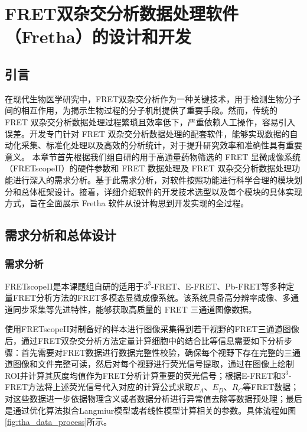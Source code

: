 \chapter{FRET双杂交分析数据处理软件（Fretha）的设计和开发}

\section{引言}

\ifshowtext
在现代生物医学研究中，FRET双杂交分析作为一种关键技术，用于检测生物分子间的相互作用，为揭示生物过程的分子机制提供了重要手段。然而，传统的 FRET 双杂交分析数据处理过程繁琐且效率低下，严重依赖人工操作，容易引入误差。开发专门针对 FRET 双杂交分析数据处理的配套软件，能够实现数据的自动化采集、标准化处理以及高效的分析统计，对于提升研究效率和准确性具有重要意义。
本章节首先根据我们组自研的用于高通量药物筛选的 FRET 显微成像系统（FRETscopeII）的硬件参数和 FRET 数据处理及 FRET 双杂交分析数据处理功能进行深入的需求分析。基于此需求分析，对软件按照功能进行科学合理的模块划分和总体框架设计。接着，详细介绍软件的开发技术选型以及每个模块的具体实现方式，旨在全面展示 Fretha 软件从设计构思到开发实现的全过程。
\fi

\section{需求分析和总体设计}

\subsection{需求分析}

\ifshowtext
FRETscopeII是本课题组自研的适用于$3^3$-FRET、E-FRET、Pb-FRET等多种定量FRET分析方法的FRET多模态显微成像系统。该系统具备高分辨率成像、多通道同步采集等先进特性，能够获取高质量的 FRET 三通道图像数据。

使用FRETscopeII对制备好的样本进行图像采集得到若干视野的FRET三通道图像后，通过FRET双杂交分析方法定量计算细胞中的结合比等信息需要如下分析步骤：首先需要对FRET数据进行数据完整性校验，确保每个视野下存在完整的三通道图像和文件完整可读，然后对每个视野进行荧光信号提取，通过在图像上绘制ROI并计算其灰度均值作为FRET分析计算重要的荧光信号；根据E-FRET和$3^3$-FRET方法将上述荧光信号代入对应的计算公式求取$E_A$、$E_D$、$R_C$等FRET数据；对这些数据进一步依据物理含义或者数据分析进行异常值去除等数据预处理；最后是通过优化算法拟合Langmiur模型或者线性模型计算相关的参数。具体流程如图\ref{fig:tha_data_process}所示。

